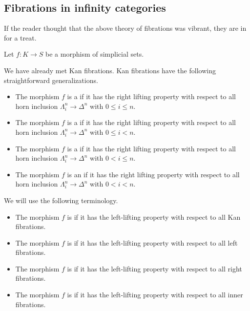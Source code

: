\documentclass[main.tex]{subfiles}
\begin{document}
\subsection{Fibrations in infinity categories}
\label{ssc:fibrations_in_infinity_categories}

If the reader thought that the above theory of fibrations was vibrant, they are in for a treat.

Let $f\colon K \to S$ be a morphism of simplicial sets.

We have already met Kan fibrations. Kan fibrations have the following straightforward generalizations.

\begin{itemize}
  \item The morphism $f$ is a  if it has the right lifting property with respect to all horn inclusion $\Lambda^{n}_{i} \to \Delta^{n}$ with $0 \leq i \leq n$.

  \item The morphism $f$ is a  if it has the right lifting property with respect to all horn inclusion $\Lambda^{n}_{i} \to \Delta^{n}$ with $0 \leq i < n$.

  \item The morphism $f$ is a  if it has the right lifting property with respect to all horn inclusion $\Lambda^{n}_{i} \to \Delta^{n}$ with $0 < i \leq n$.

  \item The morphism $f$ is an  if it has the right lifting property with respect to all horn inclusion $\Lambda^{n}_{i} \to \Delta^{n}$ with $0 < i < n$.
\end{itemize}

We will use the following terminology.
\begin{itemize}
  \item The morphism $f$ is  if it has the left-lifting property with respect to all Kan fibrations.

  \item The morphism $f$ is  if it has the left-lifting property with respect to all left fibrations.

  \item The morphism $f$ is  if it has the left-lifting property with respect to all right fibrations.

  \item The morphism $f$ is  if it has the left-lifting property with respect to all inner fibrations.
\end{itemize}
\end{document}
